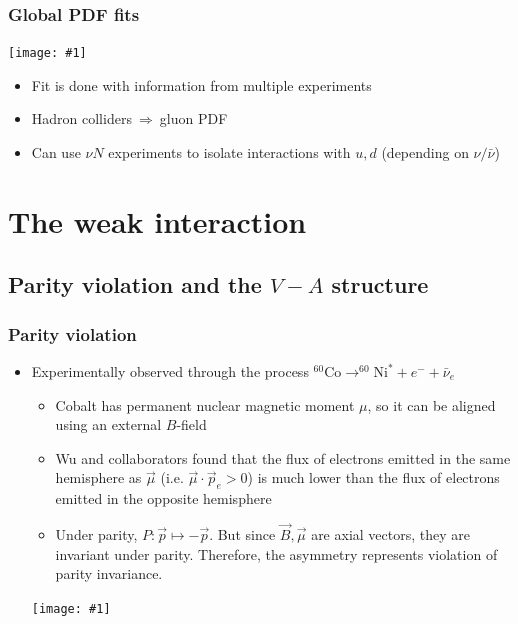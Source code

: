 \documentclass[11pt]{article}
\newcommand{\nubar}{{\bar{\nu}}}
\newcommand{\el}{\ensuremath{e^{-}}\xspace}
\newcommand{\thus}{\ensuremath{~\Rightarrow~}}
\newcommand{\embedimgw}[2]{\begin{center}\texttt{[image: \#1]}\end{center}}
\begin{document}
\subsubsection{Global PDF fits}
\embedimgw{figs/pdf_global.png}{.5}
\begin{itemize}
  \item Fit is done with information from multiple experiments
  \item Hadron colliders\thus gluon PDF
  \item Can use $\nu N$ experiments to isolate interactions with $u,d$ (depending on $\nu/\nubar$)
\end{itemize}

\section{The weak interaction}
\subsection{Parity violation and the $V-A$ structure}
\subsubsection{Parity violation}
\begin{itemize}
  \item Experimentally observed through the process $^{60}\text{Co}\rightarrow^{60}\text{Ni}^* + \el + \nubar_e$
  \begin{itemize}
    \item Cobalt has permanent nuclear magnetic moment $\mu$, so it can be aligned using an external $B$-field
    \item Wu and collaborators found that the flux of electrons emitted in the same hemisphere as $\vec\mu$ (i.e. $\vec\mu\cdot \vec p_e>0$) is much lower than the flux of electrons emitted in the opposite hemisphere
    \item Under parity, $P:\vec p \mapsto - \vec p$. But since $\vec B,\vec \mu$ are axial vectors, they are invariant under parity. Therefore, the asymmetry represents violation of parity invariance.
  \end{itemize}
  \embedimgw{figs/wu.png}{.4}
\end{itemize}
\end{document}
